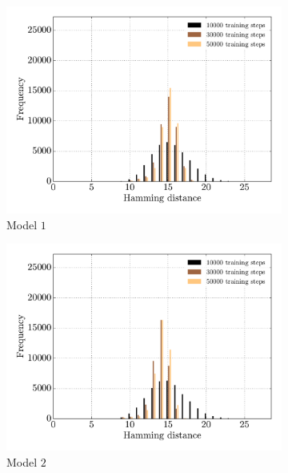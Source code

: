 \begin{figure}[p]
    \centering
    \begin{subfigure}{0.48\textwidth}
    	\centering
        \includegraphics[width=\textwidth]{appendix/hamming_freqs_model1}
        \caption{Model $1$}
        \label{fig:ham-freq-1}
    \end{subfigure}
    \hfill
    \begin{subfigure}{0.48\textwidth}
    	\centering
        \includegraphics[width=\textwidth]{appendix/hamming_freqs_model2}
        \caption{Model $2$}
        \label{fig:ham-freq-2}
    \end{subfigure}
    \begin{subfigure}{0.48\textwidth}

\end{subfigure}
\end{figure}
